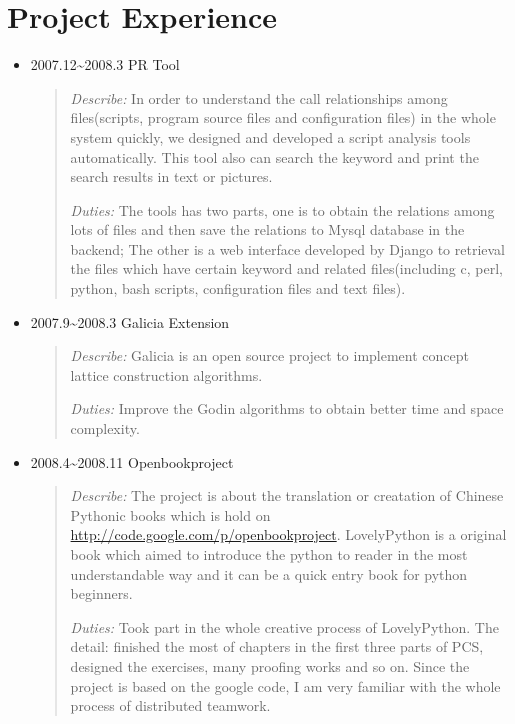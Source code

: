\documentclass[a4paper,10pt,english]{manual}
\begin{document}
\section{Project Experience}
\begin{itemize}
\item {} 
2007.12\textasciitilde{}2008.3 PR Tool
\begin{quote}

\emph{Describe:} In order to understand the call relationships among files(scripts, program source files and configuration files) in the whole system quickly, we designed and developed a script analysis tools automatically. This tool also can search the keyword and print the search results in text or pictures.

\emph{Duties:} The tools has two parts, one is to obtain the relations among lots of files and then save the relations to Mysql database in the backend; The other is a web interface developed by Django to retrieval the files which have certain keyword and related files(including c, perl, python, bash scripts, configuration files and text files).
\end{quote}

\item {} 
2007.9\textasciitilde{}2008.3 Galicia Extension
\begin{quote}

\emph{Describe:} Galicia is an open source project to implement concept lattice construction algorithms.

\emph{Duties:} Improve the Godin algorithms to obtain better time and space complexity.
\end{quote}

\item {} 
2008.4\textasciitilde{}2008.11 Openbookproject
\begin{quote}

\emph{Describe:} The project is about the translation or creatation of Chinese Pythonic books which is hold on \href{http://code.google.com/p/openbookproject/}{http://code.google.com/p/openbookproject}. LovelyPython is a original book which aimed to introduce the python to reader in the most understandable way and it can be a quick entry book for python beginners.

\emph{Duties:} Took part in the whole creative process of LovelyPython. The detail: finished the most of chapters in the first three parts of PCS,  designed the exercises, many proofing works and so on. Since the project is based on the google code, I am very familiar with the whole process of distributed teamwork.
\end{quote}


\end{itemize}
\end{document}
